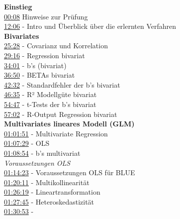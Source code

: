 \documentclass[
  10pt,
  letterpaper,
  a4paper, twoside]{scrreprt}
\begin{document}
\textbf{Einstieg}\\
\href{https://www.youtube.com/watch?v=gz0x-WSROe4&t=8s}{00:08} Hinweise
zur Prüfung ~\\
\href{https://www.youtube.com/watch?v=gz0x-WSROe4&t=726s}{12:06} - Intro
und Überblick über die erlernten Verfahren\\
\textbf{Bivariates}\\
\href{https://www.youtube.com/watch?v=gz0x-WSROe4&t=1528s}{25:28} -
Covarianz und Korrelation\\
\href{https://www.youtube.com/watch?v=gz0x-WSROe4&t=1756s}{29:16} -
Regression bivariat\\
\href{https://www.youtube.com/watch?v=gz0x-WSROe4&t=2041s}{34:01} - b's
(bivariat)\\
\href{https://www.youtube.com/watch?v=gz0x-WSROe4&t=2210s}{36:50} -
BETAs bivariat\\
\href{https://www.youtube.com/watch?v=gz0x-WSROe4&t=2552s}{42:32} -
Standardfehler der b's bivariat\\
\href{https://www.youtube.com/watch?v=gz0x-WSROe4&t=2795s}{46:35} - R²
Modellgüte bivariat\\
\href{https://www.youtube.com/watch?v=gz0x-WSROe4&t=3287s}{54:47} -
t-Tests der b's bivariat\\
\href{https://www.youtube.com/watch?v=gz0x-WSROe4&t=3422s}{57:02} -
R-Output Regression bivariat\\
\textbf{Multivariates lineares Modell (GLM)}\\
\href{https://www.youtube.com/watch?v=gz0x-WSROe4&t=3711s}{01:01:51} -
Multivariate Regression\\
\href{https://www.youtube.com/watch?v=gz0x-WSROe4&t=4049s}{01:07:29} -
OLS\\
\href{https://www.youtube.com/watch?v=gz0x-WSROe4&t=4134s}{01:08:54} -
b's multivariat\\
\emph{Voraussetzungen OLS}\\
\href{https://www.youtube.com/watch?v=gz0x-WSROe4&t=4463s}{01:14:23} -
Voraussetzungen OLS für BLUE\\
\href{https://www.youtube.com/watch?v=gz0x-WSROe4&t=4811s}{01:20:11} -
Multikollinearität\\
\href{https://www.youtube.com/watch?v=gz0x-WSROe4&t=5179s}{01:26:19} -
Lineartransformation\\
\href{https://www.youtube.com/watch?v=gz0x-WSROe4&t=5265s}{01:27:45} -
Heteroskedastizität\\
\href{https://www.youtube.com/watch?v=gz0x-WSROe4&t=5453s}{01:30:53} -
\end{document}
